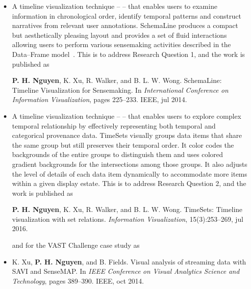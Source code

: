 \begin{itemize}
	\item A timeline visualization technique -- \emph{} -- that enables users to examine information in chronological order, identify temporal patterns and construct narratives from relevant user annotations. SchemaLine produces a compact but aesthetically pleasing layout and provides a set of fluid interactions allowing users to perform various sensemaking activities described in the Data--Frame model~\cite{Klein2003}. This is to address Research Question 1, and the work is published as 
	
	\textbf{P. H. Nguyen}, K. Xu, R. Walker, and B. L. W. Wong. SchemaLine: Timeline Visualization for Sensemaking. In \textit{International Conference on Information Visualization}, pages 225--233. IEEE, jul 2014.
	
	\item A timeline visualization technique -- \emph{} -- that enables users to explore complex temporal relationship by effectively representing both temporal and categorical provenance data. TimeSets visually groups data items that share the same group but still preserves their temporal order. It color codes the backgrounds of the entire groups to distinguish them and uses colored gradient backgrounds for the intersections among those groups. It also adjusts the level of details of each data item dynamically to accommodate more items within a given display estate. This is to address Research Question 2, and the work is published as  
	
	\textbf{P. H. Nguyen}, K. Xu, R. Walker, and B. L. W. Wong. TimeSets: Timeline visualization with set relations. \textit{Information Visualization}, 15(3):253--269, jul 2016. 
	
	and for the VAST Challenge case study as
	
	\item K. Xu, \textbf{P. H. Nguyen}, and B. Fields. Visual analysis of streaming data with SAVI and SenseMAP. In \textit{IEEE Conference on Visual Analytics Science and Technology}, pages 389--390. IEEE, oct 2014.
	 

\end{itemize}

